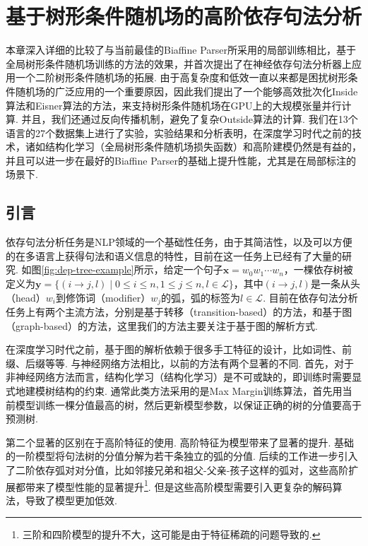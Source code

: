 \chapter{基于树形条件随机场的高阶依存句法分析}\label{cha:dep-crf}

本章深入详细的比较了与当前最佳的Biaffine Parser所采用的局部训练相比，基于全局树形条件随机场训练的方法的效果，并首次提出了在神经依存句法分析器上应用一个二阶树形条件随机场的拓展.
由于高复杂度和低效一直以来都是困扰树形条件随机场的广泛应用的一个重要原因，因此我们提出了一个能够高效批次化Inside算法和Eisner算法的方法，来支持树形条件随机场在GPU上的大规模张量并行计算.
并且，我们还通过反向传播机制，避免了复杂Outside算法的计算.
我们在13个语言的27个数据集上进行了实验，实验结果和分析表明，在深度学习时代之前的技术，诸如结构化学习（全局树形条件随机场损失函数）和高阶建模仍然是有益的，并且可以进一步在最好的Biaffine Parser的基础上提升性能，尤其是在局部标注的场景下.

\section{引言}

依存句法分析任务是NLP领域的一个基础性任务，由于其简洁性，以及可以方便的在多语言上获得句法和语义信息的特性，目前在这一任务上已经有了大量的研究. 如图\ref{fig:dep-tree-example}所示，给定一个句子$\boldsymbol{x}=w_0w_1\cdots w_n$，一棵依存树被定义为$\boldsymbol{y}=\{(i\rightarrow j,l)\mid 0\le i \le n,1 \le j \le n,l \in \mathcal{L}\}$，其中$(i\rightarrow j,l)$是一条从头（head）$w_i$到修饰词（modifier）$w_j$的弧，弧的标签为$l \in \mathcal{L}$. 目前在依存句法分析任务上有两个主流方法，分别是基于转移（transition-based）的方法，和基于图（graph-based）的方法，这里我们的方法主要关注于基于图的解析方式.

在深度学习时代之前，基于图的解析依赖于很多手工特征的设计，比如词性、前缀、后缀等等.
与神经网络方法相比，以前的方法有两个显著的不同.
首先，对于非神经网络方法而言，结构化学习（结构化学习）是不可或缺的，即训练时需要显式地建模树结构的约束.
通常此类方法采用的是Max Margin训练算法，首先用当前模型训练一棵分值最高的树，然后更新模型参数，以保证正确的树的分值要高于预测树.

第二个显著的区别在于高阶特征的使用. 高阶特征为模型带来了显著的提升.
基础的一阶模型将句法树的分值分解为若干条独立的弧的分值\cite{mcdonald-etal-2005-online}. 后续的工作进一步引入了二阶依存弧对对分值，比如邻接兄弟\cite{mcdonald-pereira-2006-online}和祖父-父亲-孩子这样的弧对\cite{carreras-2007-experiments,koo-collins-2010-efficient}，这些高阶扩展都带来了模型性能的显著提升\footnote{三阶和四阶模型的提升不大，这可能是由于特征稀疏的问题导致的\cite{koo-collins-2010-efficient,ma-zhao-2012-fourth}.}. 但是这些高阶模型需要引入更复杂的解码算法，导致了模型更加低效.


